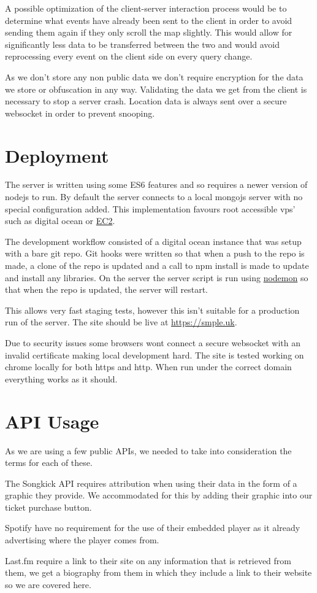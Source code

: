 \documentclass[10pt]{article}
\begin{document}
        A possible optimization of the client-server interaction process would be to determine what events have already been sent to the client in order to avoid sending them again if they only scroll the map slightly. This would allow for significantly less data to be transferred between the two and would avoid reprocessing every event on the client side on every query change.

        As we don't store any non public data we don't require encryption for the data we store or obfuscation in any way. Validating the data we get from the client is necessary to stop a server crash. Location data is always sent over a secure websocket in order to prevent snooping.

    \section{Deployment}
        The server is written using some ES6 features and so requires a newer version of nodejs to run. By default the server connects to a local mongojs server with no special configuration added. This implementation favours root accessible vps' such as digital ocean or \href{https://aws.amazon.com/ec2/}{EC2}.

        The development workflow consisted of a digital ocean instance that was setup with a bare git repo. Git hooks were written so that when a push to the repo is made, a clone of the repo is updated and a call to npm install is made to update and install any libraries. On the server the server script is run using \href{https://github.com/remy/nodemon}{nodemon} so that when the repo is updated, the server will restart.

        This allows very fast staging tests, however this isn't suitable for a production run of the server. The site should be live at \href{https://smple.uk}{https://smple.uk}.

        Due to security issues some browsers wont connect a secure websocket with an invalid certificate making local development hard. The site is tested working on chrome locally for both https and http. When run under the correct domain everything works as it should.

    \section{API Usage}
        As we are using a few public APIs, we needed to take into consideration the terms for each of these.

        The Songkick API requires attribution when using their data in the form of a graphic they provide. We accommodated for this by adding their graphic into our ticket purchase button.

        Spotify have no requirement for the use of their embedded player as it already advertising where the player comes from.

        Last.fm require a link to their site on any information that is retrieved from them, we get a biography from them in which they include a link to their website so we are covered here.
\end{document}
